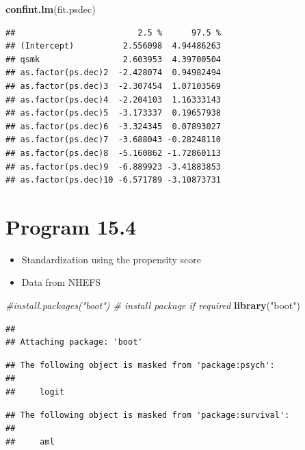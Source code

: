 \documentclass[
  10pt,
]{book}
\newenvironment{Shaded}{\begin{snugshade}}{\end{snugshade}}
\newcommand{\CommentTok}[1]{\textcolor[rgb]{0.56,0.35,0.01}{\textit{#1}}}
\newcommand{\KeywordTok}[1]{\textcolor[rgb]{0.13,0.29,0.53}{\textbf{#1}}}
\newcommand{\NormalTok}[1]{#1}
\newcommand{\StringTok}[1]{\textcolor[rgb]{0.31,0.60,0.02}{#1}}
\providecommand{\tightlist}{%
  \setlength{\itemsep}{0pt}\setlength{\parskip}{0pt}}
\begin{document}
\begin{Shaded}
\begin{Highlighting}[]
\KeywordTok{confint.lm}\NormalTok{(fit.psdec)}
\end{Highlighting}
\end{Shaded}

\begin{verbatim}
##                         2.5 %      97.5 %
## (Intercept)          2.556098  4.94486263
## qsmk                 2.603953  4.39700504
## as.factor(ps.dec)2  -2.428074  0.94982494
## as.factor(ps.dec)3  -2.307454  1.07103569
## as.factor(ps.dec)4  -2.204103  1.16333143
## as.factor(ps.dec)5  -3.173337  0.19657938
## as.factor(ps.dec)6  -3.324345  0.07893027
## as.factor(ps.dec)7  -3.688043 -0.28248110
## as.factor(ps.dec)8  -5.160862 -1.72860113
## as.factor(ps.dec)9  -6.889923 -3.41883853
## as.factor(ps.dec)10 -6.571789 -3.10873731
\end{verbatim}

\hypertarget{program-15.4}{%
\section{Program 15.4}\label{program-15.4}}

\begin{itemize}
\tightlist
\item
  Standardization using the propensity score
\item
  Data from NHEFS
\end{itemize}

\begin{Shaded}
\begin{Highlighting}[]
\CommentTok{#install.packages("boot") # install package if required}
\KeywordTok{library}\NormalTok{(}\StringTok{"boot"}\NormalTok{)}
\end{Highlighting}
\end{Shaded}

\begin{verbatim}
## 
## Attaching package: 'boot'
\end{verbatim}

\begin{verbatim}
## The following object is masked from 'package:psych':
## 
##     logit
\end{verbatim}

\begin{verbatim}
## The following object is masked from 'package:survival':
## 
##     aml
\end{verbatim}
\end{document}
